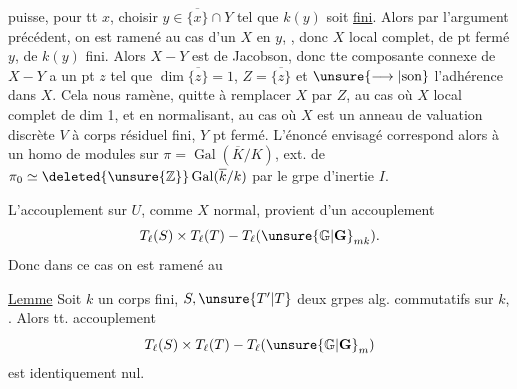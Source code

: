 puisse, pour tt $x$, choisir $y\in\overline{\{x\}}\cap Y$ tel que $k(y)$ soit \uline{fini}.  Alors par l'argument précédent, on est ramené au cas d'un   $X$ en $y$, , donc $X$ local complet, de pt fermé $y$, de $k(y)$ fini. Alors $X-Y$ est de Jacobson, donc tte composante connexe de $X-Y$ a un pt $z$ tel que $\dim\overline{\{z\}}=1$, \uline{} $Z=\overline{\{z\}}$ et $\unsure{\longrightarrow|\text{son}}$ l'adhérence dans $X$. Cela nous ramène,  quitte à remplacer $X$ par $Z$, au cas où $X$ local complet de dim 1, et en normalisant, au cas où $X$ est  un anneau de valuation discrète $V$ à corps résiduel fini, $Y$ pt fermé. L'énoncé envisagé correspond alors à un homo de modules sur $\pi=\operatorname{Gal}(\overline K/K)$, ext. de $\pi_0\simeq\deleted{\unsure{\mathbb Z}}\operatorname{Gal}(\overline k/k)$  par le grpe d'inertie $I$.

L'accouplement sur $U$, comme $X$ normal, provient d'un accouplement
\[
T_\ell(S)\times T_\ell(T)\mathbin{-}T_\ell(\unsure{\mathbb G|\mathbf G}_{mk}).
\]
Donc dans ce cas on est ramené au

\uline{Lemme} Soit $k$ un corps fini, $S,\unsure{T'|T}$ deux grpes alg. commutatifs sur $k$,  . Alors tt. accouplement
\[
T_\ell(S)\times T_\ell(T)\mathbin{-}T_\ell(\unsure{\mathbb G|\mathbf G}_m)
\]
est identiquement nul.
